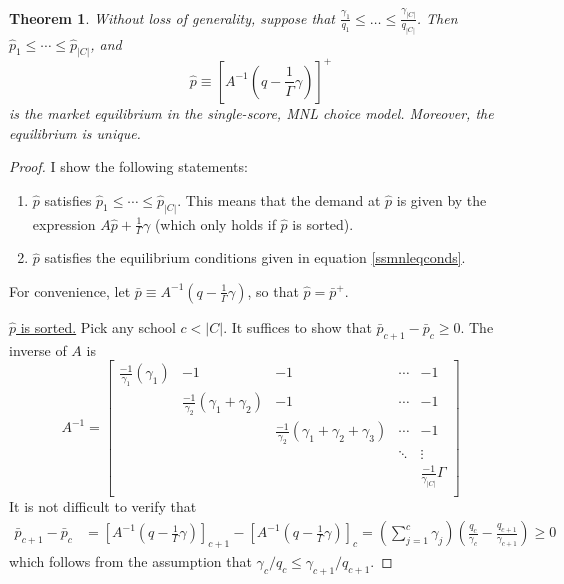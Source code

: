 \documentclass[12pt]{article}
\newtheorem{theorem}{Theorem}
\theoremstyle{definition}
\begin{document}
\begin{theorem} \label{cutoffsortationthm}
Without loss of generality, suppose that $\frac{\gamma_1}{q_1} \leq \dots \leq \frac{\gamma_{|C|}}{q_{|C|}}$. Then $\hat p_1 \leq \cdots \leq \hat p_{|C|}$, and
\[\hat p \equiv \left[A^{-1} (q - \frac{1}{\Gamma} \gamma) \right]^+\]
is the market equilibrium in the single-score, MNL choice model. Moreover, the equilibrium is unique. 
\end{theorem} 

\begin{proof}
I show the following statements:
\begin{enumerate}
\item $\hat p$ satisfies $\hat p_1 \leq \cdots \leq \hat p_{|C|}$. This means that the demand at $\hat p$ is given by the expression $A \hat p + \frac{1}{\Gamma}\gamma$ (which only holds if $\hat p$ is sorted).
\item $\hat p$ satisfies the equilibrium conditions given in equation \eqref{ssmnleqconds}.
\end{enumerate}
For convenience, let $\bar p \equiv A^{-1} (q - \frac{1}{\Gamma} \gamma) $, so that $\hat p = \bar p^+$. 

\underline{$\hat p$ is sorted.} Pick any school $c < |C|$. It suffices to show that $\bar p_{c+1} - \bar p_{c} \geq 0$. The inverse of $A$ is
\begin{equation} \label{Ainv}
A^{-1} = \begin{bmatrix}
\frac{-1}{\gamma_1}\left( \gamma_1 \right) & -1 & -1 &\cdots & -1 \\
 & \frac{-1}{\gamma_2}\left( \gamma_1 + \gamma_2 \right) & -1 &\cdots & -1 \\
 & & \frac{-1}{\gamma_2}\left( \gamma_1 + \gamma_2 + \gamma_3 \right) &\cdots & -1 \\
 &  &  & \ddots & \vdots \\
 & & & &  \frac{-1}{\gamma_{|C|}} \Gamma \\
\end{bmatrix}
\end{equation}
It is not difficult to verify that
\begin{align} \label{barpissorted}
\bar p_{c+1} - \bar p_{c}
&= \left[A^{-1} (q - \frac{1}{\Gamma} \gamma) \right]_{c+1} - \left[A^{-1} (q - \frac{1}{\Gamma} \gamma) \right]_{c} = \left(\sum_{j=1}^c \gamma_j \right) \left(\frac{q_c}{\gamma_c} - \frac{q_{c+1}}{\gamma_{c+1}}\right) \geq 0
\end{align}
which follows from the assumption that $\gamma_c / q_c \leq \gamma_{c+1} / q_{c+1}$.


\end{proof}
\end{document}
